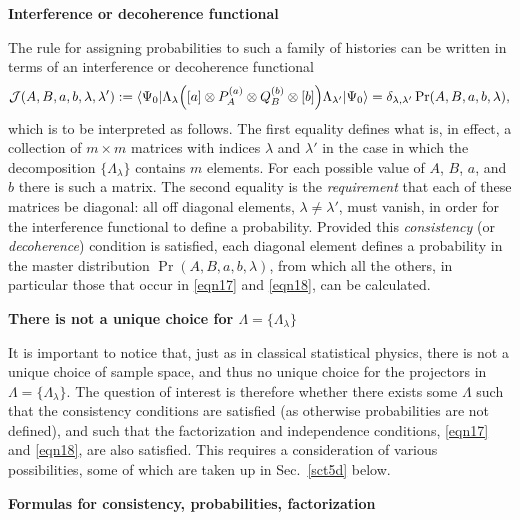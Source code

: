 \documentclass[12pt]{article} %
\def\outl#1{\par{\medskip\noindent\hspace*{.5cm}\bf
      \mathversion{bold}#1\mathversion{normal}\smallskip} }
\def\np{} \def\xa{} \def\xb{} \def\xn{} \def\xp{}
\def\outl#1{} \def\np{} \def\xa{} \def\xb{} \def\xn{} \def\xp{}
\def\outl#1{\par{\medskip\noindent\hspace*{.5cm}\bf
      \mathversion{bold}#1\mathversion{normal}\smallskip} }
\def\np{\newpage }\def\xn{\nopagebreak }\def\xp{\pagebreak }
\newcommand{\Blp}{\Bigl(}
\newcommand{\Brp}{\Bigr)}
\newcommand{\lgl}{\langle }
\newcommand{\mte}[2]{\lgl#1|#2|#1\rgl }
\newcommand{\ot}{\otimes }
\newcommand{\rgl}{\rangle }
\newcommand{\tm}{\times }
\newcommand{\JM}{{\mathcal J}}
\newcommand{\dl}{\delta }
\newcommand{\lm}{\lambda }
\newcommand{\Lm}{\Lambda }
\begin{document}
\xb
\outl{Interference or decoherence functional }
\xa


The rule for assigning probabilities to such a family of histories can be
written in terms of an interference or decoherence functional \cite{GMHr93}
\begin{equation}
  \JM(A,B,a,b,\lm,\lm') := 
 \mte{\Psi_0}{\Lm_\lm \Blp [a]\ot P^{(a)}_A\ot Q^{(b)}_B  \ot[b]  
 \Brp \Lm_{\lm'}} =
 \dl_{\lm,\lm'} \Pr(A,B,a,b,\lm),
\label{eqn35}
\end{equation}
which is to be interpreted as follows. The first equality defines what is, in
effect, a collection of $m\tm m$ matrices with indices $\lm$ and $\lm'$ in the
case in which the decomposition $\{\Lm_\lm\}$ contains $m$ elements.  For each
possible value of $A$, $B$, $a$, and $b$ there is such a matrix. The second
equality is the \emph{requirement} that each of these matrices be diagonal:
all off diagonal elements, $\lm\neq \lm'$, must vanish, in order for the
interference functional to define a probability.  Provided this
\emph{consistency} (or \emph{decoherence}) condition is satisfied, each
diagonal element defines a probability in the master distribution
$\Pr(A,B,a,b,\lm)$, from which all the others, in particular those that occur
in \eqref{eqn17} and \eqref{eqn18}, can be calculated.


\xb
\outl{There is not a unique choice for $\Lm=\{\Lm_\lm\}$}
\xa



It is important to notice that, just as in classical statistical physics,
there is not a unique choice of sample space, and thus no unique choice for
the projectors in $\Lm=\{\Lm_\lm\}$. The question of interest is therefore
whether there exists some $\Lm$ such that the consistency conditions are
satisfied (as otherwise probabilities are not defined), and such that the
factorization and independence conditions, \eqref{eqn17} and \eqref{eqn18},
are also satisfied.  This requires a consideration of various possibilities,
some of which are taken up in Sec.~\ref{sct5d} below.

\xb
\outl{Formulas for consistency, probabilities, factorization}
\xa
\end{document}
